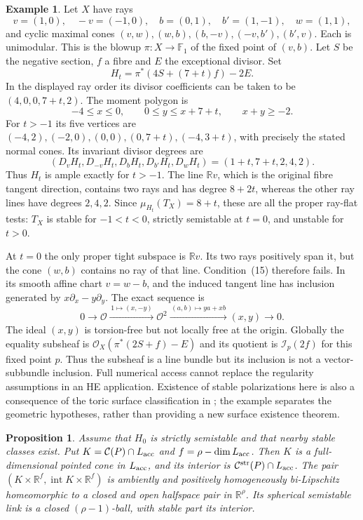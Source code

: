 \documentclass[11pt]{amsart}
\newtheorem{proposition}[theorem]{Proposition}
\theoremstyle{definition}
\newtheorem{example}[theorem]{Example}
\theoremstyle{remark}
\newcommand{\RR}{\mathbb R}
\newcommand{\cO}{\mathcal O}
\newcommand{\cC}{\mathcal C}
\begin{document}
\begin{example}\label{ex04:singularquotient}
Let $X$ have rays
\[
 v=(1,0),\quad -v=(-1,0),\quad b=(0,1),\quad
 b'=(1,-1),\quad w=(1,1),
\]
and cyclic maximal cones
$(v,w),(w,b),(b,-v),(-v,b'),(b',v)$. Each is unimodular.
This is the blowup $\pi:X\to\mathbb F_1$ of the fixed point of
$(v,b)$. Let $S$ be the negative section, $f$ a fibre and $E$ the
exceptional divisor. Set
\[
 H_t=\pi^*(4S+(7+t)f)-2E.
\]
In the displayed ray order its divisor coefficients can be taken to
be $(4,0,0,7+t,2)$. The moment polygon is
\[
 -4\le x\le0,\qquad 0\le y\le x+7+t,\qquad x+y\ge-2.
\]
For $t>-1$ its five vertices are
$(-4,2),(-2,0),(0,0),(0,7+t),(-4,3+t)$, with precisely the stated
normal cones. Its invariant divisor degrees are
\begin{equation}\label{eq04:surfacedegrees}
 (D_vH_t,D_{-v}H_t,D_bH_t,D_{b'}H_t,D_wH_t)
       =(1+t,7+t,2,4,2).
\end{equation}
Thus $H_t$ is ample exactly for $t>-1$. The line $\RR v$, which
is the original fibre tangent direction, contains two rays and has
degree $8+2t$, whereas the other ray lines have degrees $2,4,2$.
Since $\mu_{H_t}(T_X)=8+t$, these are all the proper ray-flat tests:
$T_X$ is stable for $-1<t<0$, strictly semistable at $t=0$, and
unstable for $t>0$.

At $t=0$ the only proper tight subspace is $\RR v$. Its two rays
positively span it, but the cone $(w,b)$ contains no ray of that line.
Condition~(15) therefore fails. In its smooth affine chart $v=w-b$,
and the induced tangent line has inclusion generated by
$x\partial_x-y\partial_y$. The exact sequence is
\[
 0\longrightarrow\cO\xrightarrow{\,1\mapsto(x,-y)\,}\cO^2
 \xrightarrow{\,(a,b)\mapsto ya+xb\,}(x,y)\longrightarrow0.
\]
The ideal $(x,y)$ is torsion-free but not locally free at the origin.
Globally the equality subsheaf is
$\cO_X(\pi^*(2S+f)-E)$ and its quotient is $\mathcal I_p(2f)$
for this fixed point $p$. Thus the subsheaf is a line bundle but its
inclusion is not a vector-subbundle inclusion. Full numerical access
cannot replace the regularity assumptions in an HE application.
Existence of stable polarizations here is also a consequence of the
toric surface classification in \cite[Theorem~1.3]{heringnillsuess2022};
the example separates the geometric hypotheses, rather than providing
a new surface existence theorem.
\end{example}

\begin{proposition}\label{prop04:topology}
Assume that \(H_0\) is strictly semistable and that nearby stable
classes exist. Put \(K=\cC(P)\cap L_{\rm acc}\) and
\(f=\rho-\dim L_{\rm acc}\). Then \(K\) is a full-dimensional
pointed cone in \(L_{\rm acc}\), and its interior is
\(\cC^{\rm str}(P)\cap L_{\rm acc}\). The pair
\((K\times\RR^f,\operatorname{int}K\times\RR^f)\) is ambiently
and positively homogeneously bi-Lipschitz homeomorphic to a closed
and open halfspace pair in \(\RR^\rho\). Its spherical semistable
link is a closed \((\rho-1)\)-ball, with stable part its interior.
\end{proposition}
\end{document}
